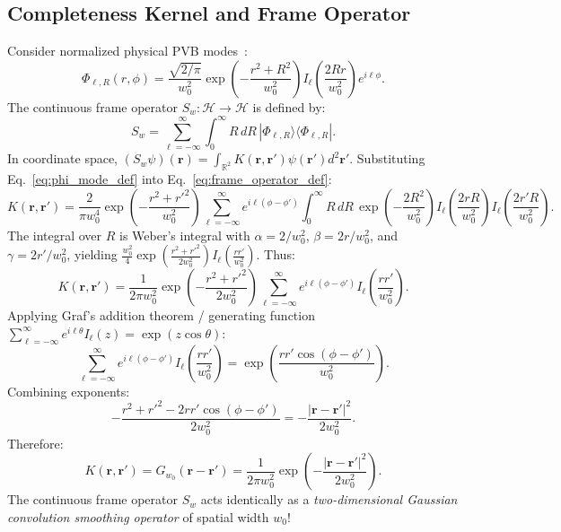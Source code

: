 \documentclass[11pt,a4paper]{article}
\begin{document}
\subsection{Completeness Kernel and Frame Operator}

Consider normalized physical PVB modes~\cite{Ferreira2026}:
\begin{equation}
\Phi_{\ell, R}(r, \phi) = \frac{\sqrt{2/\pi}}{w_0^2} \exp\left( - \frac{r^2 + R^2}{w_0^2} \right) I_\ell\left( \frac{2 R r}{w_0^2} \right) e^{i \ell \phi}.
\label{eq:phi_mode_def}
\end{equation}
The continuous frame operator $S_w: \mathcal{H} \to \mathcal{H}$ is defined by:
\begin{equation}
S_w = \sum_{\ell=-\infty}^\infty \int_0^\infty R \, dR \, |\Phi_{\ell, R}\rangle \langle \Phi_{\ell, R}|.
\label{eq:frame_operator_def}
\end{equation}
In coordinate space, $(S_w \psi)(\mathbf{r}) = \int_{\mathbb{R}^2} K(\mathbf{r}, \mathbf{r}') \psi(\mathbf{r}') d^2\mathbf{r}'$. Substituting Eq.~\eqref{eq:phi_mode_def} into Eq.~\eqref{eq:frame_operator_def}:
\begin{equation}
K(\mathbf{r}, \mathbf{r}') = \frac{2}{\pi w_0^4} \exp\left( - \frac{r^2 + r'^2}{w_0^2} \right) \sum_{\ell=-\infty}^\infty e^{i \ell(\phi - \phi')} \int_0^\infty R \, dR \, \exp\left( - \frac{2 R^2}{w_0^2} \right) I_\ell\left( \frac{2 r R}{w_0^2} \right) I_\ell\left( \frac{2 r' R}{w_0^2} \right).
\label{eq:kernel_integral_setup}
\end{equation}
The integral over $R$ is Weber's integral with $\alpha = 2/w_0^2$, $\beta = 2r/w_0^2$, and $\gamma = 2r'/w_0^2$, yielding $\frac{w_0^2}{4} \exp(\frac{r^2 + r'^2}{2w_0^2}) I_\ell(\frac{r r'}{w_0^2})$. Thus:
\begin{equation}
K(\mathbf{r}, \mathbf{r}') = \frac{1}{2\pi w_0^2} \exp\left( - \frac{r^2 + r'^2}{2 w_0^2} \right) \sum_{\ell=-\infty}^\infty e^{i \ell(\phi - \phi')} I_\ell\left( \frac{r r'}{w_0^2} \right).
\label{eq:kernel_after_weber}
\end{equation}
Applying Graf's addition theorem / generating function $\sum_{\ell=-\infty}^\infty e^{i \ell \theta} I_\ell(z) = \exp(z \cos \theta)$:
\begin{equation}
\sum_{\ell=-\infty}^\infty e^{i \ell(\phi - \phi')} I_\ell\left( \frac{r r'}{w_0^2} \right) = \exp\left( \frac{r r' \cos(\phi - \phi')}{w_0^2} \right).
\label{eq:graf_application}
\end{equation}
Combining exponents:
\begin{equation}
- \frac{r^2 + r'^2 - 2 r r' \cos(\phi - \phi')}{2 w_0^2} = - \frac{|\mathbf{r} - \mathbf{r}'|^2}{2 w_0^2}.
\label{eq:coordinate_difference}
\end{equation}
Therefore:
\begin{equation}
\boxed{K(\mathbf{r}, \mathbf{r}') = G_{w_0}(\mathbf{r} - \mathbf{r}') = \frac{1}{2\pi w_0^2} \exp\left( - \frac{|\mathbf{r} - \mathbf{r}'|^2}{2 w_0^2} \right).}
\label{eq:gaussian_kernel}
\end{equation}
The continuous frame operator $S_w$ acts identically as a \emph{two-dimensional Gaussian convolution smoothing operator} of spatial width $w_0$!
\end{document}
